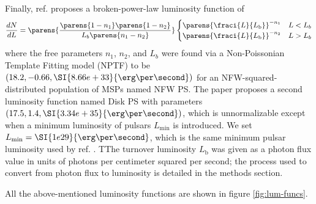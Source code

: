 \documentclass{C://Aliases//Dropbox-MIT//Latex_Templates//personal}
\begin{document}
Finally, ref. \cite{Lee:2015fea} proposes a broken-power-law luminosity function of 
\begin{equation}
    \frac{dN}{dL} = \parens{\frac{\parens{1-n_1}\parens{1-n_2}}{L_b \parens{n_1 - n_2}}}\begin{cases}
        \parens{\fraci{L}{L_\text{b}}}^{-n_{1}} & L < L_{b} \\
        \parens{\fraci{L}{L_\text{b}}}^{-n_{2}} & L > L_b
    \end{cases}
    \label{eqn:nptf}
\end{equation}
where the free parameters  $n_1$, $n_2$, and $L_b$ were found via a Non-Poissonian Template Fitting model (NPTF) to be $(18.2, -0.66, \SI{8.66e+33}{\erg\per\second})$ for an NFW-squared-distributed population of MSPs named NFW PS. The paper proposes a second luminosity function named Disk PS with parameters $(17.5, 1.4, \SI{3.34e+35}{\erg\per\second})$, which is unnormalizable except when a minimum luminosity of pulsars $L_\text{min}$ is introduced. We set $L_\text{min}=\SI{1e29}{\erg\per\second}$, which is the same minimum pulsar luminosity used by ref. \cite{Zhong:2019ycb}. TThe turnover luminosity $L_\text{b}$ was given as a photon flux value in units of photons per centimeter squared per second; the process used to convert from photon flux to luminosity is detailed in the methods section.

All the above-mentioned luminosity functions are shown in figure \ref{fig:lum-funcs}.
\end{document}
